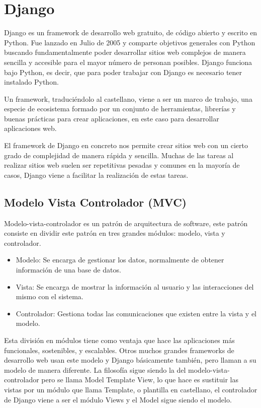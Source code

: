 \documentclass[a4paper, 12pt]{book}
\begin{document}
  
\section{Django}
Django es un framework de desarrollo web gratuito, de código abierto y escrito en Python. Fue lanzado en Julio de 2005 y comparte objetivos generales con Python buscando fundamentalmente poder desarrollar sitios web complejos de manera sencilla y accesible para el mayor número de personan posibles. Django funciona bajo Python, es decir, que para poder trabajar con Django es necesario tener instalado Python. 

Un framework, traduciéndolo al castellano, viene a ser un marco de trabajo, una especie de ecosistema formado por un  conjunto de herramientas, librerías y buenas prácticas para crear aplicaciones, en este caso para desarrollar aplicaciones web. 

El framework de Django en concreto nos permite crear sitios web con un cierto grado de complejidad de manera rápida y sencilla. Muchas de las tareas al realizar sitios web suelen ser repetitivas pesadas y comunes en la mayoría de casos, Django viene a facilitar la realización de estas tareas. 

\subsection{Modelo Vista Controlador (MVC)}
Modelo-vista-controlador es un patrón de arquitectura de software, este patrón consiste en dividir este patrón en tres grandes módulos: modelo, vista y controlador. 

\begin{itemize}
 \item Modelo: Se encarga de gestionar los datos, normalmente de obtener información de una base de datos. 
 \item Vista: Se encarga de mostrar la información al usuario y las interacciones del mismo con el sistema. 
 \item Controlador: Gestiona todas las comunicaciones que existen entre la vista y el modelo. 
\end{itemize}

Esta división en módulos tiene como ventaja que hace las aplicaciones más funcionales, sostenibles, y escalables. Otros muchos grandes frameworks de desarrollo web usan este modelo y Django básicamente también, pero llaman a su modelo de manera diferente. La filosofía sigue siendo la del modelo-vista-controlador pero se llama Model Template View, lo que hace es sustituir las vistas por un módulo que llama Template, o plantilla en castellano, el controlador de Django viene a ser el módulo Views y el Model sigue siendo el modelo.
\end{document}
